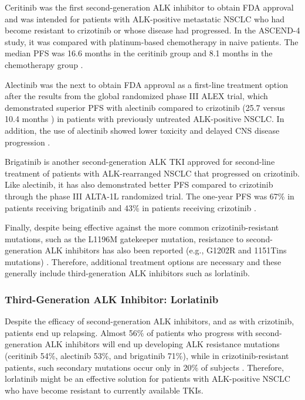 Ceritinib was the first second-generation ALK inhibitor to obtain FDA approval and was intended for patients with ALK-positive metastatic NSCLC who had become resistant to crizotinib or whose disease had progressed. In the ASCEND-4 study, it was compared with platinum-based chemotherapy in naive patients. The median PFS was 16.6 months in the ceritinib group and 8.1 months in the chemotherapy group \cite{Ceritinib}.

Alectinib was the next to obtain FDA approval as a first-line treatment option after the results from the global randomized phase III ALEX trial, which demonstrated superior PFS with alectinib compared to crizotinib (25.7 versus 10.4 months \cite{NSCLC_drivers}) in patients with previously untreated ALK-positive NSCLC. In addition, the use of alectinib showed lower toxicity and delayed CNS disease progression \cite{Alectinib}.

Brigatinib is another second-generation ALK TKI approved for second-line treatment of patients with ALK-rearranged NSCLC that progressed on crizotinib. Like alectinib, it has also demonstrated better PFS compared to crizotinib through the phase III ALTA-1L randomized trial. The one-year PFS was 67\% in patients receiving brigatinib and 43\% in patients receiving crizotinib \cite{ALK_inhibitors}.

Finally, despite being effective against the more common crizotinib-resistant mutations, such as the L1196M gatekeeper mutation, resistance to second-generation ALK inhibitors has also been reported (e.g., G1202R and 1151Tins mutations) \cite{ALK_types_resistance}. Therefore, additional treatment options are necessary and these generally include third-generation ALK inhibitors such as lorlatinib.

\subsubsection{Third-Generation ALK Inhibitor: Lorlatinib}

Despite the efficacy of second-generation ALK inhibitors, and as with crizotinib, patients end up relapsing. Almost 56\% of patients who progress with second-generation ALK inhibitors will end up developing ALK resistance mutations (ceritinib 54\%, alectinib 53\%, and brigatinib 71\%), while in crizotinib-resistant patients, such secondary mutations occur only in 20\% of subjects \cite{Mol_resistance}. Therefore, lorlatinib might be an effective solution for patients with ALK-positive NSCLC who have become resistant to currently available TKIs.

